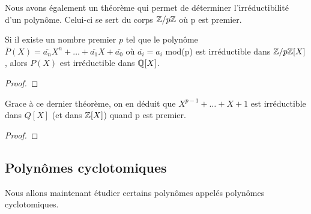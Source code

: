 Nous avons également un théorème qui permet de déterminer l'irréductibilité d'un
polynôme. Celui-ci se sert du corps $\mathbb{Z}/p\mathbb{Z}$ où p est premier.

\begin{theorem}
	Si il existe un nombre premier $p$ tel que le polynôme $\overline{P}(X) =
	\overline{a_{n}}X^{n} + \ldots + \overline{a_{1}}X + \overline{a_{0}}$ où
	$\overline{a_{i}} = a_{i}$ mod(p) est irréductible dans
	$\mathbb{Z}/p\mathbb{Z}[X]$, alors $P(X)$ est irréductible dans $\mathbb{Q}[X]$.
\end{theorem}

\ifdefined\outputproof
\begin{proof}

\end{proof}
\fi

\begin{corollary}
	Grace à ce dernier théorème, on en déduit que $X^{p - 1} + \ldots + X + 1$
	est irréductible dans $Q[X]$ (et dans $\mathbb{Z}[X]$) quand p est premier.
\end{corollary}

\ifdefined\outputproof
\begin{proof}

\end{proof}
\fi

\subsection{Polynômes cyclotomiques}

Nous allons maintenant étudier certains polynômes appelés polynômes
cyclotomiques.





